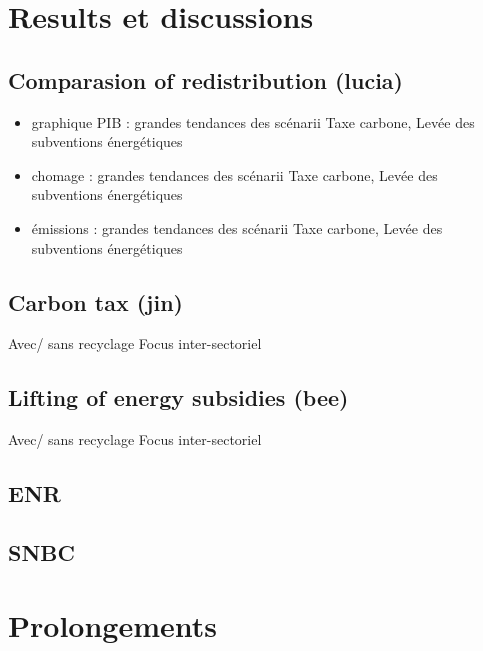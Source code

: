\documentclass[
]{article}
\providecommand{\tightlist}{%
  \setlength{\itemsep}{0pt}\setlength{\parskip}{0pt}}
\begin{document}
\hypertarget{results-et-discussions}{%
\section{Results et discussions}\label{results-et-discussions}}

\hypertarget{comparasion-of-redistribution-lucia}{%
\subsection{Comparasion of redistribution
(lucia)}\label{comparasion-of-redistribution-lucia}}

\begin{itemize}
\tightlist
\item
  graphique PIB : grandes tendances des scénarii Taxe carbone, Levée des
  subventions énergétiques
\item
  chomage : grandes tendances des scénarii Taxe carbone, Levée des
  subventions énergétiques
\item
  émissions : grandes tendances des scénarii Taxe carbone, Levée des
  subventions énergétiques
\end{itemize}

\hypertarget{carbon-tax-jin-1}{%
\subsection{Carbon tax (jin)}\label{carbon-tax-jin-1}}

Avec/ sans recyclage Focus inter-sectoriel

\hypertarget{lifting-of-energy-subsidies-bee}{%
\subsection{Lifting of energy subsidies
(bee)}\label{lifting-of-energy-subsidies-bee}}

Avec/ sans recyclage Focus inter-sectoriel

\hypertarget{enr}{%
\subsection{ENR}\label{enr}}

\hypertarget{snbc}{%
\subsection{SNBC}\label{snbc}}

\hypertarget{prolongements}{%
\section{Prolongements}\label{prolongements}}
\end{document}
